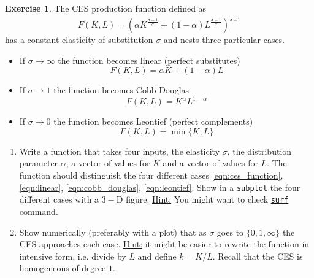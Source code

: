 \documentclass[a4paper,11pt]{article}
\theoremstyle{definition}
\newtheorem{exercise}{Exercise}
\begin{document}
\begin{exercise}
The CES production function defined as
\begin{equation}
F(K, L) = \left(\alpha K^{\frac{\sigma - 1}{\sigma}} + (1 - \alpha) L^{\frac{\sigma - 1}{\sigma}}\right)^{\frac{\sigma}{\sigma - 1}}
\label{eqn:ces_function}
\end{equation}
has a constant elasticity of substitution $\sigma$ and nests three particular cases. 
\begin{itemize}
    \item If $\sigma\rightarrow\infty$ the function becomes linear (perfect substitutes)
    \begin{equation}
    F(K,L) = \alpha K + (1 - \alpha)L
    \label{eqn:linear}
    \end{equation}
    \item If $\sigma\rightarrow 1$ the function becomes Cobb-Douglas
    \begin{equation}
    F(K,L) = K^{\alpha}L^{1-\alpha}
    \label{eqn:cobb_douglas}
    \end{equation}
    \item If $\sigma\rightarrow 0$ the function becomes Leontief (perfect complements)
    \begin{equation}
    F(K,L) = \min\{K,L\}
    \label{eqn:leontief}
    \end{equation}
\end{itemize}

\begin{enumerate}
    \item Write a function that takes four inputs, the elasticity $\sigma$, the distribution parameter $\alpha$, a vector of values for $K$ and a vector of values for $L$. The function should distinguish the four different cases \eqref{eqn:ces_function}, \eqref{eqn:linear}, \eqref{eqn:cobb_douglas}, \eqref{eqn:leontief}. Show in a \verb;subplot; the four different cases with a $3-$D figure. \underline{Hint:} You might want to check \href{https://www.mathworks.com/help/matlab/ref/surf.html}{\texttt{surf}} command.
    \item Show numerically (preferably with a plot) that as $\sigma$ goes to $\{0, 1, \infty\}$ the CES approaches each case. \underline{Hint:} it might be easier to rewrite the function in intensive form, i.e. divide by $L$ and define $k = K/L$. Recall that the CES is homogeneous of degree $1$.
\end{enumerate}
\end{exercise}
\end{document}
